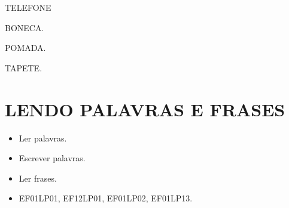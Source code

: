 \begin{escolha}
\item TELEFONE

\item BONECA.

\item POMADA.

\item TAPETE.
\end{escolha}

\chapter{LENDO PALAVRAS E FRASES}


\begin{itemize}
\item Ler palavras.

\item Escrever palavras.

\item Ler frases.
\end{itemize}


\begin{itemize}
\item EF01LP01, EF12LP01, EF01LP02, EF01LP13.
\end{itemize}


